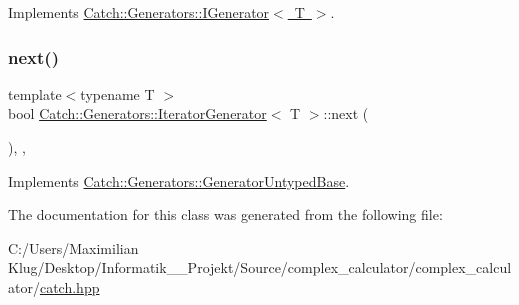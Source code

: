 Implements \mbox{\hyperlink{struct_catch_1_1_generators_1_1_i_generator_a525d381fc9249a885b075a0632a8579a}{Catch\+::\+Generators\+::\+I\+Generator$<$ T $>$}}.

\mbox{\label{class_catch_1_1_generators_1_1_iterator_generator_acafb4fa1eebe5e1db571621a35a3f137}} 
\subsubsection{\texorpdfstring{next()}{next()}}
{\footnotesize\ttfamily template$<$typename T $>$ \\
bool \mbox{\hyperlink{class_catch_1_1_generators_1_1_iterator_generator}{Catch\+::\+Generators\+::\+Iterator\+Generator}}$<$ T $>$\+::next (\begin{DoxyParamCaption}{ }\end{DoxyParamCaption})\hspace{0.3cm}{\ttfamily [inline]}, {\ttfamily [override]}, {\ttfamily [virtual]}}



Implements \mbox{\hyperlink{class_catch_1_1_generators_1_1_generator_untyped_base_aeed3c0cd6233c5f553549e453b8d6638}{Catch\+::\+Generators\+::\+Generator\+Untyped\+Base}}.



The documentation for this class was generated from the following file\+:\begin{DoxyCompactItemize}
\item 
C\+:/\+Users/\+Maximilian Klug/\+Desktop/\+Informatik\+\_\+\_\+\+Projekt/\+Source/complex\+\_\+calculator/complex\+\_\+calculator/\mbox{\hyperlink{catch_8hpp}{catch.\+hpp}}\end{DoxyCompactItemize}
